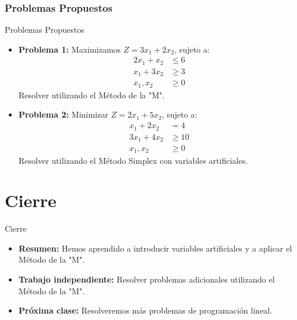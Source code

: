 \documentclass{beamer}
\begin{document}
\subsubsection{Problemas Propuestos}
\begin{frame}{Problemas Propuestos}
    \begin{itemize}
        \item \textbf{Problema 1:} Maximizamos \(Z = 3x_1 + 2x_2\), sujeto a:
        \begin{align*}
            2x_1 + x_2 &\leq 6 \\
            x_1 + 3x_2 &\geq 3 \\
            x_1, x_2 &\geq 0
        \end{align*}
        Resolver utilizando el Método de la "M".

        \item \textbf{Problema 2:} Minimizar \(Z = 2x_1 + 5x_2\), sujeto a:
        \begin{align*}
            x_1 + 2x_2 &= 4 \\
            3x_1 + 4x_2 &\geq 10 \\
            x_1, x_2 &\geq 0
        \end{align*}
        Resolver utilizando el Método Simplex con variables artificiales.
    \end{itemize}
\end{frame}

\section{Cierre}

\begin{frame}{Cierre}
    \begin{itemize}
        \item \textbf{Resumen:} Hemos aprendido a introducir variables artificiales y a aplicar el Método de la "M".
        \item \textbf{Trabajo independiente:} Resolver problemas adicionales utilizando el Método de la "M".
        \item \textbf{Próxima clase:} Resolveremos más problemas de programación lineal.
    \end{itemize}
\end{frame}
\end{document}
